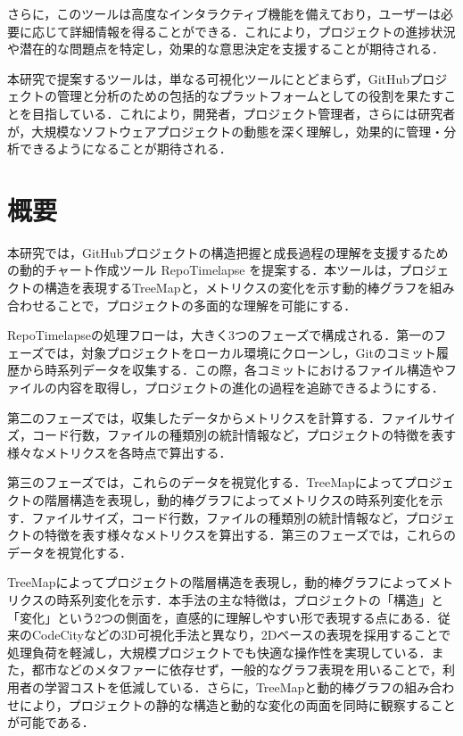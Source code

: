 \documentclass[12pt,twoside]{jbook}
\begin{document}
さらに，このツールは高度なインタラクティブ機能を備えており，ユーザーは必要に応じて詳細情報を得ることができる．これにより，プロジェクトの進捗状況や潜在的な問題点を特定し，効果的な意思決定を支援することが期待される．

本研究で提案するツールは，単なる可視化ツールにとどまらず，GitHubプロジェクトの管理と分析のための包括的なプラットフォームとしての役割を果たすことを目指している．これにより，開発者，プロジェクト管理者，さらには研究者が，大規模なソフトウェアプロジェクトの動態を深く理解し，効果的に管理・分析できるようになることが期待される．

\section{概要}
本研究では，GitHubプロジェクトの構造把握と成長過程の理解を支援するための動的チャート作成ツール RepoTimelapse を提案する．本ツールは，プロジェクトの構造を表現するTreeMapと，メトリクスの変化を示す動的棒グラフを組み合わせることで，プロジェクトの多面的な理解を可能にする．

RepoTimelapseの処理フローは，大きく3つのフェーズで構成される．第一のフェーズでは，対象プロジェクトをローカル環境にクローンし，Gitのコミット履歴から時系列データを収集する．この際，各コミットにおけるファイル構造やファイルの内容を取得し，プロジェクトの進化の過程を追跡できるようにする．

第二のフェーズでは，収集したデータからメトリクスを計算する．ファイルサイズ，コード行数，ファイルの種類別の統計情報など，プロジェクトの特徴を表す様々なメトリクスを各時点で算出する．

第三のフェーズでは，これらのデータを視覚化する．TreeMapによってプロジェクトの階層構造を表現し，動的棒グラフによってメトリクスの時系列変化を示す．ファイルサイズ，コード行数，ファイルの種類別の統計情報など，プロジェクトの特徴を表す様々なメトリクスを算出する．第三のフェーズでは，これらのデータを視覚化する．

TreeMapによってプロジェクトの階層構造を表現し，動的棒グラフによってメトリクスの時系列変化を示す．本手法の主な特徴は，プロジェクトの「構造」と「変化」という2つの側面を，直感的に理解しやすい形で表現する点にある．従来のCodeCityなどの3D可視化手法と異なり，2Dベースの表現を採用することで処理負荷を軽減し，大規模プロジェクトでも快適な操作性を実現している．また，都市などのメタファーに依存せず，一般的なグラフ表現を用いることで，利用者の学習コストを低減している．さらに，TreeMapと動的棒グラフの組み合わせにより，プロジェクトの静的な構造と動的な変化の両面を同時に観察することが可能である．
\end{document}
